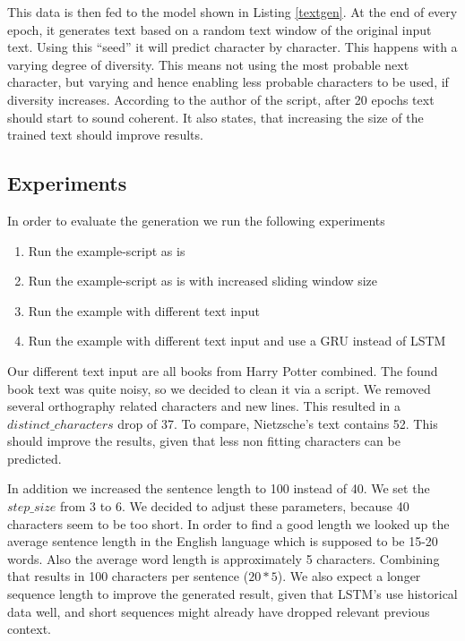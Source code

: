 \documentclass{article}[]
\begin{document}
This data is then fed to the model shown in Listing \ref{textgen}.
At the end of every epoch, it generates text based on a random text window of the original input text.
Using this \enquote{seed} it will predict character by character.
This happens with a varying degree of diversity.
This means not using the most probable next character, but varying and hence enabling less probable characters to be used, if diversity increases.
According to the author of the script, after 20 epochs text should start to sound coherent.
It also states, that increasing the size of the trained text should improve results.

\subsection{Experiments}
In order to evaluate the generation we run the following experiments
\begin{enumerate}
\item{Run the example-script as is}
\item{Run the example-script as is with increased sliding window size}
\item{Run the example with different text input}
\item{Run the example with different text input and use a GRU instead of LSTM}
\end{enumerate}

Our different text input are all books from Harry Potter combined.
The found book text was quite noisy, so we decided to clean it via a script.
We removed several orthography related characters and new lines.
This resulted in a $distinct\_characters$ drop of 37.
To compare, Nietzsche's text contains 52.
This should improve the results, given that less non fitting characters can be predicted.

In addition we increased the sentence length to 100 instead of 40.
We set the $step\_size$ from 3 to 6.
We decided to adjust these parameters, because 40 characters seem to be too short.
In order to find a good length we looked up the average sentence length in the English language which is supposed to be 15-20 words\cite{cutts2013oxford}.
Also the average word length is approximately 5 characters\cite{shannon1951prediction}.
Combining that results in 100 characters per sentence ($20 * 5$).
We also expect a longer sequence length to improve the generated result, given that LSTM's use historical data well, and short sequences might already have dropped relevant previous context\cite{sundermeyer2013comparison}.
\end{document}
